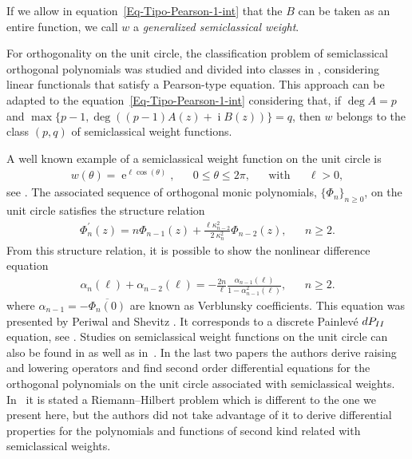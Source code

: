\documentclass[12pt]{amsart}
\newcommand{\dde}{\operatorname e}
\newcommand{\ddi}{\operatorname i}
\begin{document}
If we allow in equation~\eqref{Eq-Tipo-Pearson-1-int} that the \( B \) can be taken as an entire function, we call \( w \) a \emph{generalized semiclassical weight}.

For orthogonality on the unit circle, the classification problem of semiclassical orthogonal polynomials was studied and divided into classes in \cite{CaSu97}, considering linear functionals that satisfy a Pearson-type equation.
This approach can be adapted to the equation~\eqref{Eq-Tipo-Pearson-1-int} considering that, if \(\deg A = p \) and \(\max\{p-1, \deg((p-1)A(z) +\ddi B(z))\}=q \), then \(w \) belongs to the class \( (p,q) \) of semiclassical weight functions.

A well known example of a semiclassical weight function on the unit circle is
\begin{align*}
w(\theta) =
 \dde ^{\ell \cos(\theta)} , && 0\leqslant \theta \leqslant 2\pi , &&
\text{with} && \ell>0 ,
\end{align*}
 see \cite{Is05}. 
The associated sequence of orthogonal monic polynomials, \( \{\Phi_n\}_{n\geqslant 0} \), on the unit circle satisfies the structure relation
\begin{align}\label{structurebessel}
\Phi_{n}^{\prime}(z) = n \Phi_{n-1}(z)
+ \frac{\ell \kappa_{n-2}^2}{2 \ \kappa_{n}^2} \Phi_{n-2}(z), && n \geqslant 2.
\end{align}
From this structure relation, it is possible to show the nonlinear difference equation
\begin{align} \label{Painleve}
\alpha_{n}(\ell) + \alpha_{n-2}(\ell) = -\frac{2n}{\ell} \frac{\alpha_{n-1}(\ell)}{1-\alpha_{n -1}^2(\ell)}, && n \geqslant 2.
\end{align}
where \( \alpha_{n-1}=-\overline{\Phi_n(0)} \) are known as Verblunsky coefficients.
This equation was presented by Periwal and Shevitz \cite{PS90}. It corresponds to a discrete Painlev\'e \({\rm dP_{II}} \) equation, see \cite{Va08}. Studies on semiclassical weight functions on the unit circle can also be found in \cite{BraRe12, Ma00} as well as in~\cite{Forrester_Witte,Ismail_Witte}.
In the last two papers the authors derive raising and lowering operators and find second order differential equations
for the orthogonal polynomials on the unit circle associated with %
semiclassical weights.
In~\cite{Forrester_Witte} it is stated a Riemann--Hilbert problem which is different to the one we present here, 
but the authors did not take advantage of it to derive differential properties for the polynomials and 
functions of second kind 
related with semiclassical weights.
\end{document}
